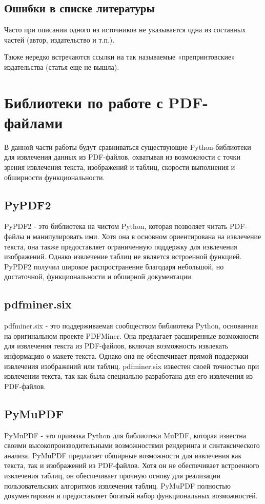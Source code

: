 \subsection{Ошибки в списке литературы}
Часто при описании одного из источников не указывается одна из составных частей (автор, издательство и т.п.).

Также нередко встречаются ссылки на так называемые «препринтовские» издательства (статья еще не вышла).

\section{Библиотеки по работе с PDF-файлами}
В данной части работы будут сравниваться существующие Python-библиотеки для извлечения данных из PDF-файлов, охватывая из возможности с точки зрения извлечения текста, изображений и таблиц, скорости выполнения и обширности функциональности.
\subsection{PyPDF2}
PyPDF2 - это библиотека на чистом Python, которая позволяет читать PDF-файлы и манипулировать ими. Хотя она в основном ориентирована на извлечение текста, она также предоставляет ограниченную поддержку для извлечения изображений. Однако извлечение таблиц не является встроенной функцией. PyPDF2 получил широкое распространение благодаря небольшой, но достаточной, функциональности и обширной документации.
\subsection{pdfminer.six}
pdfminer.six - это поддерживаемая сообществом библиотека Python, основанная на оригинальном проекте PDFMiner. Она предлагает расширенные возможности для извлечения текста из PDF-файлов, включая возможность извлекать информацию о макете текста. Однако она не обеспечивает прямой поддержки извлечения изображений или таблиц. pdfminer.six известен своей точностью при извлечении текста, так как была специально разработана для его извлечения из PDF-файлов.
\subsection{PyMuPDF}
PyMuPDF - это привязка Python для библиотеки MuPDF, которая известна своими высокопроизводительными возможностями рендеринга и синтаксического анализа. PyMuPDF предлагает обширные возможности для извлечения как текста, так и изображений из PDF-файлов. Хотя он не обеспечивает встроенного извлечения таблиц, он обеспечивает прочную основу для реализации пользовательских алгоритмов извлечения таблиц. PyMuPDF полностью документирован и предоставляет богатый набор функциональных возможностей.

